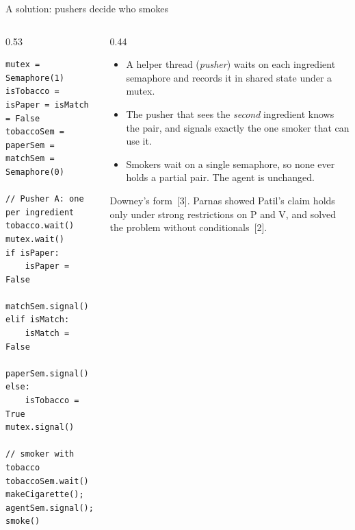 \documentclass[aspectratio=169,11pt]{beamer}
\begin{document}
\begin{frame}[fragile]{A solution: pushers decide who smokes}
  \begin{columns}[T]
    \begin{column}{0.53\textwidth}
\begin{lstlisting}
mutex = Semaphore(1)
isTobacco = isPaper = isMatch = False
tobaccoSem = paperSem = matchSem = Semaphore(0)

// Pusher A: one per ingredient
tobacco.wait()
mutex.wait()
if isPaper:
    isPaper = False
    matchSem.signal()
elif isMatch:
    isMatch = False
    paperSem.signal()
else:
    isTobacco = True
mutex.signal()

// smoker with tobacco
tobaccoSem.wait()
makeCigarette(); agentSem.signal(); smoke()
\end{lstlisting}
    \end{column}
    \begin{column}{0.44\textwidth}
      \small
      \begin{itemize}
        \item A helper thread (\emph{pusher}) waits on each ingredient
              semaphore and records it in shared state under a mutex.
        \item The pusher that sees the \emph{second} ingredient knows the pair,
              and signals exactly the one smoker that can use it.
        \item Smokers wait on a single semaphore, so none ever holds a
              partial pair. The agent is unchanged.
      \end{itemize}
      \vspace{0.3em}
      {\footnotesize Downey's form~[3]. Parnas showed Patil's claim holds
      only under strong restrictions on P and V, and solved the problem
      without conditionals~[2].}
    \end{column}
  \end{columns}
\end{frame}
\end{document}
